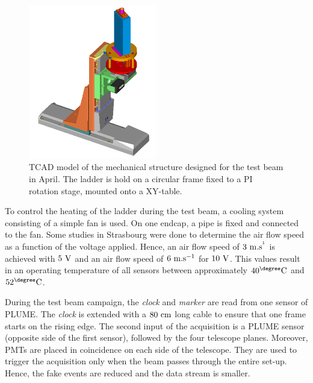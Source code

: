       \begin{figure}[!h]
        \centering
        \includegraphics[width = 0.5\textwidth]{Pictures/X0/Frame/Testbeam1.PNG}
        \caption{TCAD model of the mechanical structure designed for the test beam in April. The ladder is hold on a circular frame fixed to a PI rotation stage, mounted onto a XY-table.}
        \label{fig:mechanics}
      \end{figure}

      To control the heating of the ladder during the test beam, a cooling system consisting of a simple fan is used.
      On one endcap, a pipe is fixed and connected to the fan.
      Some studies in Strasbourg were done to determine the air flow speed as a function of the voltage applied.
      Hence, an air flow speed of $3~\rm{m.s^{^1}}$ is achieved with $5~\rm{V}$ and an air flow speed of $6~\rm{m.s^{-1}}$ for $10~\rm{V}$.
      This values result in an operating temperature of all sensors between approximately $40^{\degree}\rm{C}$ and $52^{\degree}\rm{C}$.

      During the test beam campaign, the \textit{clock} and \textit{marker} are read from one sensor of \gls{PLUME}.
      The \textit{clock} is extended with a $80~\rm{cm}$ long cable to ensure that one frame starts on the rising edge.
      The second input of the acquisition is a \gls{PLUME} sensor (opposite side of the first sensor), followed by the four telescope planes. 
      Moreover, \gls{PMT}s are placed in coincidence on each side of the telescope.
      They are used to trigger the acquisition only when the beam passes through the entire set-up.
      Hence, the fake events are reduced and the data stream is smaller.


